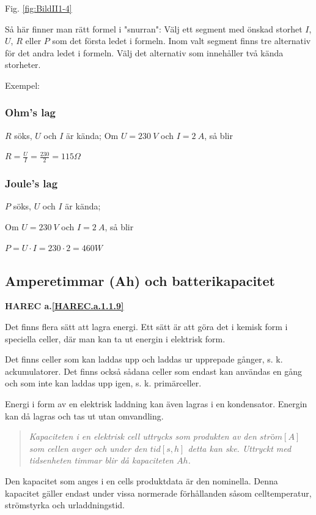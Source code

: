 Fig. \ref{fig:BildII1-4}

Så här finner man rätt formel i "snurran":
Välj ett segment med önskad storhet \(I\), \(U\), \(R\) eller \(P\) som det första
ledet i formeln. Inom valt segment finns tre alternativ för det andra
ledet i formeln. Välj det alternativ som innehåller två kända storheter.

Exempel:

\subsubsection{Ohm's lag}

\(R\) söks, \(U\) och \(I\) är kända;
Om \(U = 230\ V\) och \(I = 2\ A\), så blir

\(R=\frac{U}{I}=\frac{230}{2}=115 \Omega\)

\subsubsection{Joule's lag}

\(P\) söks, \(U\) och \(I\) är kända;

Om \(U = 230\ V\) och \(I = 2\ A\), så blir

\(P = U \cdot I = 230 \cdot 2 = 460 W\)

\subsection{Amperetimmar (Ah) och batterikapacitet}
\textbf{HAREC a.\ref{HAREC.a.1.1.9}\label{myHAREC.a.1.1.9}}

Det finns flera sätt att lagra energi. Ett sätt är att göra det i kemisk form i
speciella celler, där man kan ta ut energin i elektrisk form.

Det finns celler som kan laddas upp och laddas ur upprepade gånger, s. k.
ackumulatorer.
Det finns också sådana celler som endast kan användas en gång och som inte
kan laddas upp igen, s. k. primärceller.

Energi i form av en elektrisk laddning kan även lagras i en kondensator.
Energin kan då lagras och tas ut utan omvandling.

\begin{quote}\emph{
Kapaciteten i en elektrisk cell uttrycks som produkten av den \(ström [A]\) som
cellen avger och under den \(tid [s, h]\) detta kan ske.
Uttryckt med tidsenheten timmar blir då kapaciteten \(Ah\).
}\end{quote}

Den kapacitet som anges i en cells produktdata är den nominella. Denna kapacitet
gäller endast under vissa normerade förhållanden såsom celltemperatur,
strömstyrka och urladdningstid.

